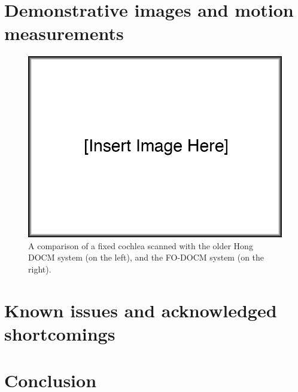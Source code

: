 \section{Demonstrative images and motion measurements}

\begin{figure}[h!]
\centering
\includegraphics[width=1.0\textwidth]{Images/missing.png}
\caption{A comparison of a fixed cochlea scanned with the older Hong DOCM system (on the left), and the FO-DOCM system (on the right).}
\end{figure}


\section{Known issues and acknowledged shortcomings}



\section{Conclusion}